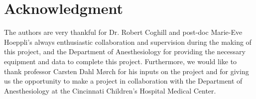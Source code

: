 \chapter*{Acknowledgment}


The authors are very thankful for Dr. Robert Coghill and post-doc Marie-Eve Hoeppli's always enthusiastic collaboration and supervision during the making of this project, and the Department of Anesthesiology for providing the necessary equipment and data to complete this project. Furthermore, we would like to thank professor Carsten Dahl Mørch for his inputs on the project and for giving us the opportunity to make a project in collaboration with the Department of Anesthesiology at the Cincinnati Children's Hospital Medical Center.      